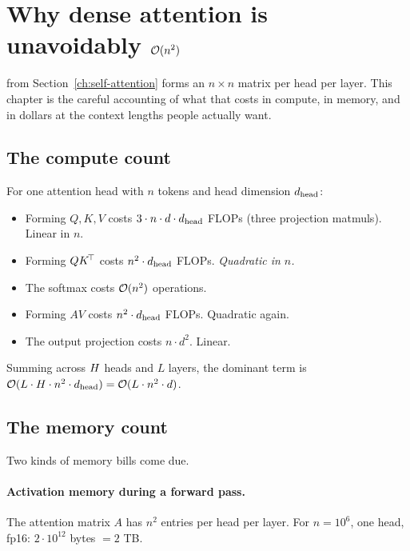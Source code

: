 \section{Why dense attention is unavoidably $\mathcal{O}(n^2)$}
\label{ch:why-quadratic}

 from Section~\ref{ch:self-attention} forms an
\(n \times n\) matrix per head per layer. This chapter is the careful
accounting of what that costs in compute, in memory, and in dollars at the
context lengths people actually want.

\subsection{The compute count}

For one attention head with \(n\) tokens and head dimension \(d_{\text{head}}\):

\begin{itemize}
\item Forming \(Q, K, V\) costs \(3 \cdot n \cdot d \cdot d_{\text{head}}\) FLOPs
(three projection matmuls). Linear in \(n\).
\item Forming \(QK^{\!\top}\) costs \(n^2 \cdot d_{\text{head}}\) FLOPs. \emph{Quadratic in \(n\).}
\item The softmax costs \(\mathcal{O}(n^2)\) operations.
\item Forming \(AV\) costs \(n^2 \cdot d_{\text{head}}\) FLOPs. Quadratic again.
\item The output projection costs \(n \cdot d^2\). Linear.
\end{itemize}
Summing across \(H\) heads and \(L\) layers, the dominant term is
\(\mathcal{O}(L \cdot H \cdot n^2 \cdot d_{\text{head}}) = \mathcal{O}(L \cdot n^2 \cdot d)\).


\subsection{The memory count}

Two kinds of memory bills come due.

\paragraph{Activation memory during a forward pass.} The attention matrix
\(A\) has \(n^2\) entries per head per layer. For \(n = 10^6\), one head,
fp16: \(2 \cdot 10^{12}\) bytes \(= 2\) TB.

